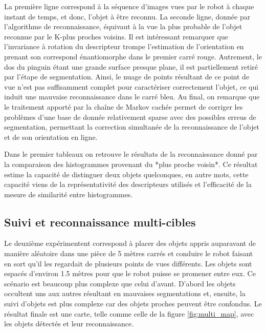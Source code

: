 La première ligne correspond à la séquence d'images vues par le robot à chaque instant de temps, et donc, l'objet à être reconnu. La seconde ligne, donnée par l'algorithme de reconnaissance, équivaut à la vue la plus probable de l'objet reconnue par le K-plus proches voisins. Il est intéressant remarquer que l'invariance à rotation du descripteur trompe l'estimation de l'orientation en prenant son correspond énantiomorphe dans le premier carré rouge. Autrement, le dos du pinguin étant une grande surface presque plane, il est partiellement retiré par l'étape de segmentation. Ainsi, le nuage de points résultant de ce point de vue n'est pas suffisamment complet pour caractériser correctement l'objet, ce qui induit une mauvaise reconnaissance dans le carré bleu. Au final, on remarque que le traitement apporté par la chaîne de Markov cachée permet de corriger les problèmes d'une base de donnée relativement sparse avec des possibles erreus de segmentation, permettant la correction simultanée de la reconnaissance de l'objet et de son orientation en ligne. 


Dans le premier tableaux on retrouve le résultats de la reconnaissance donné par la comparaison des histogrammes provenant du *plus proche voisin*. Ce résultat estime la capacité de distinguer deux objets quelconques, en autre mots, cette capacité viens de la représentativité des descripteurs utilisés et l'efficacité de la mesure de similarité entre histogrammes.

\subsection{Suivi et reconnaissance multi-cibles}

Le deuxième expérimentent correspond à placer des objets appris auparavant de manière aléatoire dans une pièce de 5 mètres carrés et conduire le robot faisant en sort qu'il les regardait de plusieurs points de vues différents. Les objets sont espacés d'environ 1.5 mètres pour que le robot puisse se promener entre eux. Ce scénario est beaucoup plus complexe que celui d'avant. D'abord les objets occultent uns aux autres résultant en mauvaises segmentations et, ensuite, la suivi d'objets est plus complexe car des objets proches peuvent être confondus.
Le résultat finale est une carte, telle comme celle de la figure \ref{fig:multi_map}, avec les objets détectés et leur reconnaissance.

